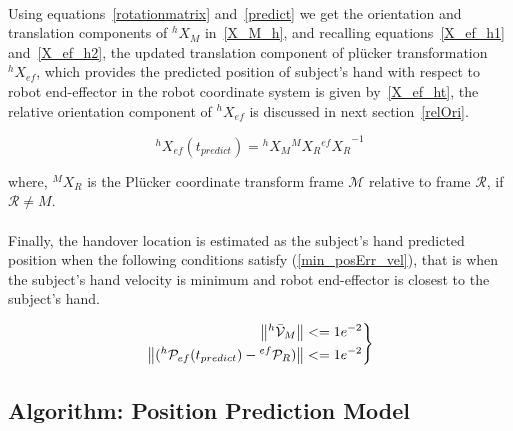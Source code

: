 \paragraph*{}
Using equations~\ref{rotationmatrix} and~\ref{predict} we get the orientation and translation components of ${}^{h}{X}_M$ in~\ref{X_M_h}, and recalling equations~\ref{X_ef_h1} and~\ref{X_ef_h2}, the updated translation component of pl\"ucker transformation ${}^{h}{X}_{ef}$, which provides the predicted position of subject's hand with respect to robot end-effector in the robot coordinate system is given by~\ref{X_ef_ht}, the relative orientation component of ${}^{h}{X}_{ef}$ is discussed in next section~\ref{relOri}.

\begin{equation}\label{X_ef_ht}
{}^{h}{X}_{ef}(t_{predict}) =  {}^{h}{X}_M  {}^{M}{X}_R {{}^{ef}{X}_R}^{-1}
\end{equation}

where, ${}^{M}{X}_R$ is the Pl\"ucker coordinate transform frame $\mathcal{M}$ relative to frame $\mathcal{R}$, if $\mathcal R \neq M$.

\paragraph{}
Finally, the handover location is estimated as the subject's hand predicted position when the following conditions satisfy (\ref{min_posErr_vel}), that is when the subject's hand velocity is minimum and robot end-effector is closest to the subject's hand.

\begin{equation}\label{min_posErr_vel}
\left.\begin{aligned}
\norm{{}^{h}\mathcal{\bar{V}}_{M}}& <= 1e^{-2} \\
\norm{({}^{h}\mathcal{P}_{ef}(t_{predict}) - {}^{ef}\mathcal{P}_{R})} & <= 1e^{-2}
\end{aligned}
\right\}
\end{equation}


\subsection{Algorithm: Position Prediction Model}

